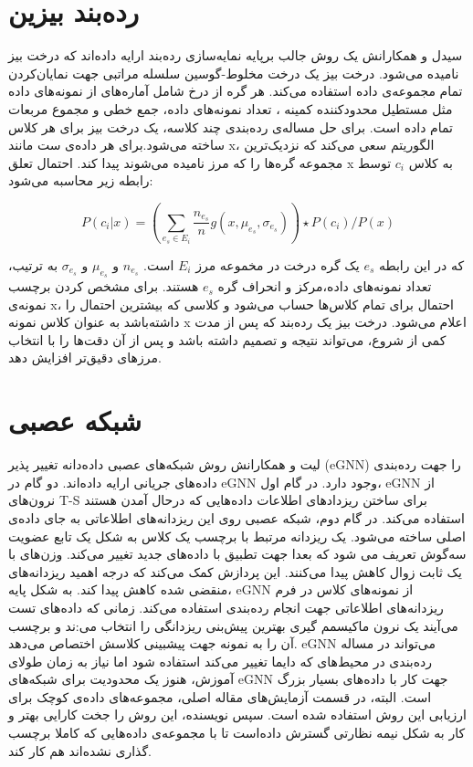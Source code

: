 \section{رده‌بند بیزین}

سیدل
و همکارانش یک روش جالب برپایه نمایه‌سازی
رده‌بند ارایه داده‌اند که درخت بیز نامیده می‌شود. درخت بیز یک درخت مخلوط-گوسین سلسله مراتبی
جهت نمایان‌کردن تمام مجموعه‌ی داده استفاده می‌کند. هر گره از درخ شامل آماره‌های از نمونه‌های داده مثل مستطیل محدود‌کننده کمینه
، تعداد نمونه‌های داده، جمع خطی و مجموع مربعات تمام داده است.
برای حل مساله‌ی رده‌بندی چند کلاسه، یک درخت بیز برای هر کلاس ساخته‌ می‌شود.برای هر داده‌ی ست مانند x، الگوریتم سعی می‌کند که نزدیک‌ترین مجموعه گره‌ها را که مرز نامیده می‌شوند پیدا کند. احتمال تعلق x به کلاس $c_i$ توسط رابطه زیر محاسبه می‌شود:

$$
P(c_i | x ) = 
\left(       
\sum_{e_s \in E_i} \frac{n_{e_s}}{n}
g(x, \mu_{e_s}, \sigma_{e_s})
\right)
\star P(c_i)/P(x)
$$


که در این رابطه $e_s$ یک گره درخت در مخموعه مرز $E_i$ است. $n_{e_s}$ و $ \mu_{e_s}$ و $\sigma_{e_s}$ به ترتیب، تعداد نمونه‌های داده،‌مرکز و انحراف گره $e_s$ هستند. برای مشخص کردن برچسب نمونه‌ی x، احتمال برای تمام کلاس‌ها حساب می‌شود و کلاسی که بیشترین احتمال را داشته‌باشد به عنوان کلاس نمونه x اعلام می‌شود. درخت بیز یک رده‌بند که پس از مدت کمی از شروع، می‌تواند نتیجه و تصمیم داشته باشد و پس از آن دقت‌ها را با انتخاب مرز‌های دقیق‌تر افزایش دهد.

\section{شبکه عصبی}
لیت
و همکارانش روش شبکه‌های عصبی داده‌دانه تغییر پذیر
(eGNN)
را جهت رده‌بندی داده‌های جریانی ارایه داده‌اند. دو گام در eGNN وجود دارد. در گام اول، eGNN از نرون‌های T-S برای ساختن ریز‌دادهای اطلاعات داده‌هایی که درحال آمدن هستند استفاده می‌کند. در گام دوم، شبکه عصبی روی این ریزدانه‌های اطلاعاتی به جای داده‌ی اصلی ساخته می‌شود. یک ریزدانه مرتبط با برچسب یک کلاس به شکل یک تابع عضویت سه‌گوش
 تعریف می شود که بعدا جهت تطبیق با داده‌های جدید تغییر می‌کند. وزن‌های با یک ثابت زوال
کاهش پیدا می‌کنند. این پردازش کمک می‌کند که درجه اهمید ریزدانه‌های منقضی شده کاهش پیدا کند. به شکل پایه، eGNN از نمونه‌های کلاس در فرم ریزدانه‌های اطلاعاتی جهت انجام رده‌بندی استفاده می‌کند. زمانی که داده‌های تست می‌آیند یک نرون ماکیسمم گیری بهترین پیش‌بنی ریزدانگی را انتخاب می‌:ند و برچسب آن را به نمونه جهت پیشبینی کلاسش اختصاص می‌دهد. eGNN می‌تواند در مساله رده‌بندی در محیط‌های که دایما تغییر می‌کند استفاده شود اما نیاز به زمان طولای آموزش، هنوز یک محدودیت برای شبکه‌های eGNN جهت کار با داده‌های بسیار بزرگ است. البته، در قسمت آزمایش‌های مقاله اصلی، مجموعه‌های داده‌ی کوچک برای ارزیابی این روش استفاده شده است. سپس نویسنده، این روش‌ را جخت کارایی بهتر و کار به شکل نیمه نظارتی گسترش داده‌است تا با مجموعه‌ی داده‌هایی که کاملا برچسب گذاری نشده‌اند هم کار کند. 

